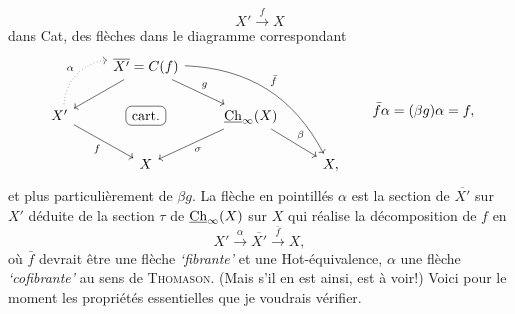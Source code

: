\[
X'\xrightarrow{\ f\ }X
\]
dans Cat, des flèches dans le diagramme correspondant
\[
\begin{tikzcd}
& \overline{X'}=C(f) \arrow[dl] \arrow[dr, "g"] \arrow[ddrr, bend left=30, "\bar{f}"] & & \\
X' \arrow[ur, dotted, bend left=40, "\alpha"] \arrow[dr, "f"'] & |[draw, rounded corners]| \text{cart.} & \uCh_\infty(X) \arrow[dl, "\sigma"] \arrow[dr, "\beta"] & \\
& X & & X,
\end{tikzcd}
\qquad
\bar{f}\alpha=(\beta g)\alpha=f,
\]
et plus particulièrement de $\beta g$. La flèche
en pointillés $\alpha$ est la section de $\overline{X'}$ sur $X'$ déduite de la section $\tau$ de $\underline{\mathrm{Ch}}_\infty(X)$ sur $X$ qui réalise la décomposition de $f$ en
\[
X'\xrightarrow{\ \alpha\ }\overline{X'}\xrightarrow{\ \bar{f}\ }X,
\]
où $\bar{f}$ devrait être une flèche \textit{`fibrante'} et une Hot-équivalence, $\alpha$ une flèche \textit{`cofibrante'} au sens de \textsc{Thomason}. (Mais s'il en est ainsi, est à voir!) Voici pour le moment les propriétés essentielles que je voudrais vérifier.

